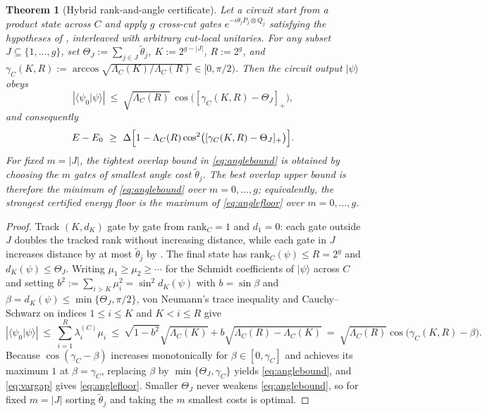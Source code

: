 \documentclass[reprint,aps,pra,floatfix,superscriptaddress,nofootinbib,longbibliography]{revtex4-2}
\newtheorem{theorem}{Theorem}
\theoremstyle{remark}
\theoremstyle{definition}
\newcommand{\ket}[1]{\lvert #1 \rangle}
\newcommand{\braket}[2]{\langle #1 \vert #2 \rangle}
\newcommand{\rank}{\mathrm{rank}}
\begin{document}
\begin{theorem}[Hybrid rank-and-angle certificate]
\label{thm:angle}
Let a circuit start from a product state across $C$ and apply $g$ cross-cut gates
$e^{-i\theta_j P_j\otimes Q_j}$ satisfying the hypotheses of ,
interleaved with arbitrary cut-local unitaries. For any subset
$J\subseteq\{1,\dots,g\}$, set $\Theta_J:=\sum_{j\in J}\tilde\theta_j$,
$K:=2^{g-|J|}$, $R:=2^g$, and
$\gamma_C(K,R):=\arccos\sqrt{\Lambda_C(K)/\Lambda_C(R)}\in[0,\pi/2)$. Then the circuit output $\ket{\psi}$ obeys
\begin{equation}
  \label{eq:anglebound}
  |\braket{\psi_0}{\psi}|\ \le\ \sqrt{\Lambda_C(R)}\,
  \cos\bigl([\gamma_C(K,R)-\Theta_J]_+\bigr),
\end{equation}
and consequently
\begin{equation}
  \label{eq:anglefloor}
  E-E_0\ \ge\ \Delta\Bigl[1-\Lambda_C(R)\cos^2\bigl([\gamma_C(K,R)-\Theta_J]_+\bigr)\Bigr].
\end{equation}
For fixed $m=|J|$, the tightest overlap bound in \eqref{eq:anglebound} is
obtained by choosing the $m$ gates of smallest angle cost $\tilde\theta_j$. The
best overlap upper bound is therefore the minimum of \eqref{eq:anglebound} over
$m=0,\dots,g$; equivalently, the strongest certified energy floor is the maximum
of \eqref{eq:anglefloor} over $m=0,\dots,g$.
\end{theorem}

\begin{proof}
Track $(K,d_K)$ gate by gate from $\rank_C=1$ and $d_1=0$: each gate outside $J$
doubles the tracked rank without increasing distance, while each gate in $J$
increases distance by at most $\tilde\theta_j$ by . The final
state has $\rank_C(\psi)\le R=2^g$ and $d_K(\psi)\le\Theta_J$. Writing $\mu_1\ge\mu_2\ge\cdots$
for the Schmidt coefficients of $\ket{\psi}$ across $C$ and setting
$b^2:=\sum_{i>K}\mu_i^2=\sin^2 d_K(\psi)$ with $b=\sin\beta$ and
$\beta=d_K(\psi)\le\min\{\Theta_J,\pi/2\}$, von Neumann's trace inequality and
Cauchy--Schwarz on indices $1\le i\le K$ and $K<i\le R$ give
\begin{equation}
  |\braket{\psi_0}{\psi}|\ \le\ \sum_{i=1}^R\lambda_i^{(C)}\mu_i
  \ \le\ \sqrt{1-b^2}\sqrt{\Lambda_C(K)}+b\sqrt{\Lambda_C(R)-\Lambda_C(K)}
  \ =\ \sqrt{\Lambda_C(R)}\cos\bigl(\gamma_C(K,R)-\beta\bigr).
\end{equation}
Because $\cos(\gamma_C-\beta)$ increases monotonically for $\beta\in[0,\gamma_C]$
and achieves its maximum $1$ at $\beta=\gamma_C$, replacing $\beta$ by
$\min\{\Theta_J,\gamma_C\}$ yields \eqref{eq:anglebound}, and \eqref{eq:vargap}
gives \eqref{eq:anglefloor}. Smaller $\Theta_J$ never weakens \eqref{eq:anglebound},
so for fixed $m=|J|$ sorting $\tilde\theta_j$ and taking the $m$ smallest costs
is optimal.
\end{proof}
\end{document}
